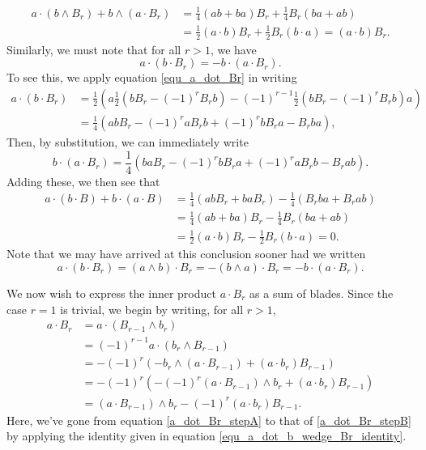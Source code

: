 \documentclass{birkjour}
\theoremstyle{definition}
\theoremstyle{remark}
\numberwithin{equation}{section}
\begin{document}
\begin{align*}
a\cdot(b\wedge B_r)+b\wedge(a\cdot B_r) &= \frac{1}{4}(ab+ba)B_r + \frac{1}{4}B_r(ba+ab) \\
 &= \frac{1}{2}(a\cdot b)B_r + \frac{1}{2}B_r(b\cdot a) = (a\cdot b)B_r.
\end{align*}
Similarly, we must note that for all $r>1$, we have
\begin{equation}\label{equ_a_dot_b_dot_Br_identity}
a\cdot(b\cdot B_r) = -b\cdot(a\cdot B_r).
\end{equation}
To see this, we apply equation \eqref{equ_a_dot_Br} in writing
\begin{align*}
a\cdot(b\cdot B_r)
 &= \frac{1}{2}\left(a\frac{1}{2}\left(bB_r-(-1)^rB_rb\right)-(-1)^{r-1}\frac{1}{2}\left(bB_r-(-1)^rB_rb\right)a\right) \\
 &= \frac{1}{4}\left(abB_r - (-1)^raB_rb + (-1)^rbB_ra - B_rba\right),
\end{align*}
Then, by substitution, we can immediately write
\begin{equation*}
b\cdot(a\cdot B_r) = \frac{1}{4}\left(baB_r - (-1)^rbB_ra + (-1)^raB_rb - B_rab\right).
\end{equation*}
Adding these, we then see that
\begin{align*}
a\cdot (b\cdot B)+b\cdot(a\cdot B)
 &= \frac{1}{4}\left(abB_r+baB_r\right)-\frac{1}{4}\left(B_rba+B_rab\right) \\
 &= \frac{1}{4}\left(ab+ba\right)B_r-\frac{1}{4}B_r\left(ba+ab\right) \\
 &= \frac{1}{2}(a\cdot b)B_r - \frac{1}{2}B_r(b\cdot a) = 0.
\end{align*}
Note that we may have arrived at this conclusion sooner had we written
\begin{equation*}
a\cdot(b\cdot B_r) = (a\wedge b)\cdot B_r = -(b\wedge a)\cdot B_r = -b\cdot(a\cdot B_r).
\end{equation*}

We now wish to express the inner product $a\cdot B_r$ as a sum of blades.
Since the case $r=1$ is trivial, we begin by writing, for all $r>1$,
\begin{align}
a\cdot B_r
 &= a\cdot(B_{r-1}\wedge b_r)\nonumber \\
 &= (-1)^{r-1}a\cdot(b_r\wedge B_{r-1})\label{a_dot_Br_stepA} \\
 &= -(-1)^r\left(-b_r\wedge(a\cdot B_{r-1})+(a\cdot b_r)B_{r-1}\right)\label{a_dot_Br_stepB} \\
 &= -(-1)^r\left(-(-1)^r(a\cdot B_{r-1})\wedge b_r+(a\cdot b_r)B_{r-1}\right)\nonumber \\
 &= (a\cdot B_{r-1})\wedge b_r - (-1)^r(a\cdot b_r)B_{r-1}.\label{equ_a_dot_Br_recursive}
\end{align}
Here, we've gone from equation \eqref{a_dot_Br_stepA} to that of \eqref{a_dot_Br_stepB} by
applying the identity given in equation \eqref{equ_a_dot_b_wedge_Br_identity}.
\end{document}
